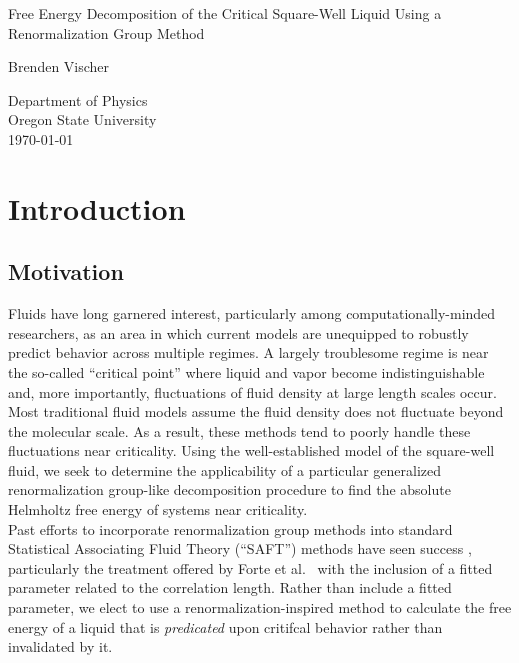 \documentclass[12pt]{article}
\title
\author \\
\renewcommand{\title}{Free Energy Decomposition of the Critical Square-Well Liquid Using a Renormalization Group Method}
\renewcommand{\author}{Brenden Vischer}
\renewcommand{\titlepage}{
    {\centering
        \vspace*{4cm}
        
        \title
        
        \vspace{1.5cm}
        
        \author \\
        \text{Advisor: David Roundy}
        
        \vfill
        
        Department of Physics\\
        Oregon State University\\
        \today 
        \newpage}       
}
\begin{document}
\thispagestyle{empty}

\titlepage





\tableofcontents
\listoffigures





\section{Introduction}
\subsection{Motivation}
Fluids have long garnered interest\cite{verlet67}\cite{vanderwaals}, particularly among computationally-minded researchers, as an area in which current models are unequipped to robustly predict behavior across multiple regimes. A largely troublesome \cite{white2001global} regime is near the so-called ``critical point'' where liquid and vapor become indistinguishable and, more importantly, fluctuations of fluid density at large length scales occur. Most traditional fluid models assume the fluid density does not fluctuate beyond the molecular scale. As a result, these methods tend to poorly handle these fluctuations near criticality. Using the well-established model of the square-well fluid, we seek to determine the applicability of a particular generalized renormalization group-like decomposition procedure to find the absolute Helmholtz free energy of systems near criticality.\\

Past efforts to incorporate renormalization group methods into standard Statistical Associating Fluid Theory (``SAFT'') methods have seen success \cite{white2001global}, particularly the treatment offered by Forte et al.~\cite{forte2011application} with the inclusion of a fitted parameter related to the correlation length. Rather than include a fitted parameter, we elect to use a renormalization-inspired method to calculate the free energy of a liquid that is {\it predicated} upon critifcal behavior rather than invalidated by it. \\
\end{document}
